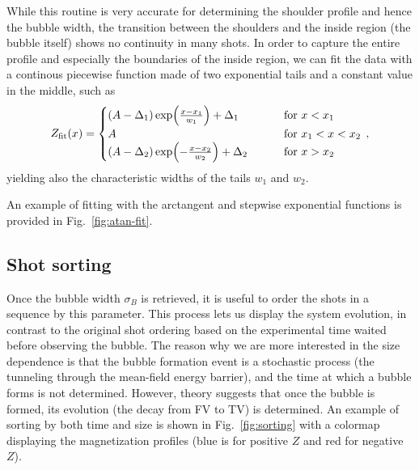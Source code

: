 While this routine is very accurate for determining the shoulder profile and hence the bubble width, the transition between the shoulders and the inside region (the bubble itself) shows no continuity in many shots. In order to capture the entire profile and especially the boundaries of the inside region, we can fit the data with a continous piecewise function made of two exponential tails and a constant value in the middle, such as
\begin{equation}
    Z_{\rm fit}(x) = 
    \begin{cases}
        (A-\Delta_1) \exp(\frac{x-x_1}{w_1}) + \Delta_1 \qquad\quad &\text{for } x < x_1\\
        A \qquad\qquad\qquad\qquad &\text{for } x_1 < x < x_2\\
        (A-\Delta_2) \exp(-\frac{x-x_2}{w_2}) + \Delta_2 \qquad &\text{for } x > x_2
    \end{cases}\, ,
    \label{eq:fit_exp}
\end{equation}
yielding also the characteristic widths of the tails $w_1$ and $w_2$.

An example of fitting with the arctangent and stepwise exponential functions is provided in Fig.\ \ref{fig:atan-fit}.

\subsection{Shot sorting}
Once the bubble width $\sigma_B$ is retrieved, it is useful to order the shots in a sequence by this parameter. This process lets us display the system evolution, in contrast to the original shot ordering based on the experimental time waited before observing the bubble. The reason why we are more interested in the size dependence is that the bubble formation event is a stochastic process (the tunneling through the mean-field energy barrier), and the time at which a bubble forms is not determined. However, theory suggests that once the bubble is formed, its evolution (the decay from FV to TV) is determined. 
An example of sorting by both time and size is shown in Fig.\ \ref{fig:sorting} with a colormap displaying the magnetization profiles (blue is for positive $Z$ and red for negative $Z$).

